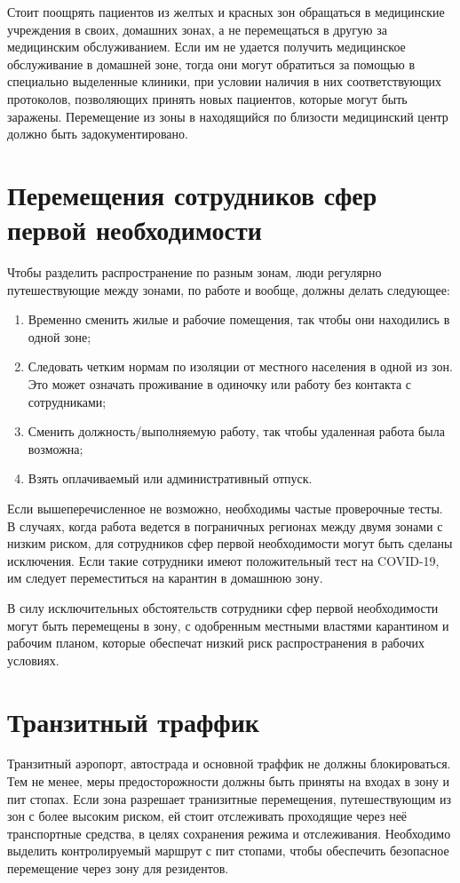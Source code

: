 \documentclass[onecolumn,journal]{IEEEtran}
\begin{document}
\begin{multicols}{2}
Стоит поощрять пациентов из желтых и красных зон обращаться в медицинские учреждения в своих, домашних зонах, а не перемещаться в другую за медицинским обслуживанием. Если им не удается получить медицинское обслуживание в домашней зоне, тогда они могут обратиться за помощью в специально выделенные клиники, при условии наличия в них соответствующих протоколов, позволяющих принять новых пациентов, которые могут быть заражены. Перемещение из зоны в находящийся по близости медицинский центр должно быть задокументировано.

\section{Перемещения сотрудников сфер первой необходимости}

Чтобы разделить распространение по разным зонам, люди регулярно путешествующие между зонами, по работе и вообще, должны делать следующее:

\begin{enumerate}
\item Временно сменить жилые и рабочие помещения, так чтобы они находились в одной зоне;
\item Следовать четким нормам по изоляции от местного населения в одной из зон. Это может означать проживание в одиночку или работу без контакта с сотрудниками;
\item Сменить должность/выполняемую работу, так чтобы удаленная работа была возможна;
\item Взять оплачиваемый или административный отпуск.
\end{enumerate}
Если вышеперечисленное не возможно, необходимы частые проверочные тесты. В случаях, когда работа ведется в пограничных регионах между двумя зонами с низким риском, для сотрудников сфер первой необходимости могут быть сделаны исключения. Если такие сотрудники имеют положительный тест на COVID-19, им следует переместиться на карантин в домашнюю зону.

В силу исключительных обстоятельств сотрудники сфер первой необходимости могут быть перемещены в зону, с одобренным местными властями карантином и рабочим планом, которые обеспечат низкий риск распространения в рабочих условиях.

\section{Транзитный траффик}

Транзитный аэропорт, автострада и основной траффик не должны блокироваться. Тем не менее, меры предосторожности должны быть приняты на входах в зону и пит стопах. Если зона разрешает транизитные перемещения, путешествующим из зон с более высоким риском, ей стоит отслеживать проходящие через неё транспортные средства, в целях сохранения режима и отслеживания. Необходимо выделить контролируемый маршрут с пит стопами, чтобы обеспечить безопасное перемещение через зону для резидентов.


\end{multicols}
\end{document}
